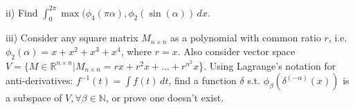 \documentclass[12pt]{article}
\begin{document}
ii) Find \large \(\displaystyle \int_0^{2\pi} \max{(\phi_4(\pi\alpha),\phi_2(\sin{(\alpha)})} \, dx\).

iii) Consider any square matrix \(M_{n \times n}\) as a polynomial with common ratio \(r\), i.e. \(\phi_2(\alpha) = x + x^2 + x^3 + x^4\), where \(r = x\). Also consider vector space \(V = \{M\in\mathbb{R}^{n\times n}|M_{n \times n} = rx+r^2x+\dotsc+r^{n^2}x\)\}. Using Lagrange's notation for anti-derivatives: \(f^{-1}(t) = \int f(t) \, dt\), find a function \(\delta\) s.t. \large \(\phi_{\beta}(\delta^{(-\alpha)} (x))\) is a subspace of \(V, \forall\beta \in \mathbb{N}\), or prove one doesn't exist.
\end{document}
